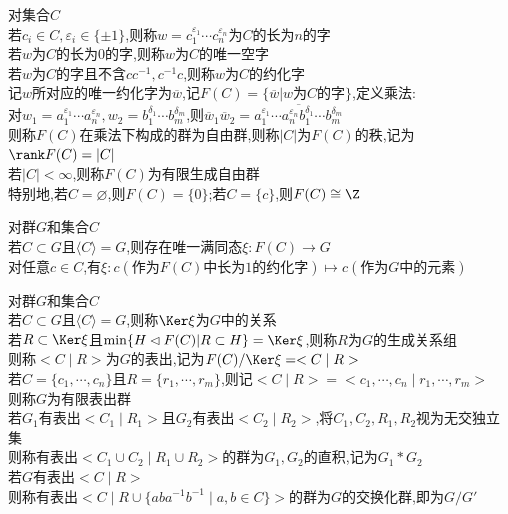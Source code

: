\begin{dingyi}
对集合$C$\\
若$c_i\in C,\varepsilon_i\in\{\pm 1\}$,则称$w=c_1^{\varepsilon_1}\cdots c_n^{\varepsilon_n}$为$C$的长为$n$的字\\
若$w$为$C$的长为$0$的字,则称$w$为$C$的唯一空字\\
若$w$为$C$的字且不含$cc^{-1},c^{-1}c$,则称$w$为$C$的约化字\\
记$w$所对应的唯一约化字为$\overline{w}$,记$F(C)=\{\overline{w}|w\text{为}C\text{的字}\}$,定义乘法:\\
对$w_1=a_1^{\varepsilon_1}\cdots a_n^{\varepsilon_n},w_2=b_1^{\delta_1}\cdots b_m^{\delta_m}$,则$\overline{w}_1\overline{w}_2=\overline{a_1^{\varepsilon_1}\cdots a_n^{\varepsilon_n}b_1^{\delta_1}\cdots b_m^{\delta_m}}$\\
则称$F(C)$在乘法下构成的群为自由群,则称$|C|$为$F(C)$的秩,记为$\rank F(C)=|C|$\\
若$|C|<\infty$,则称$F(C)$为有限生成自由群\\
特别地,若$C=\varnothing$,则$F(C)=\{0\}$;若$C=\{c\}$,则$F(C)\cong\Z$
\end{dingyi}

\begin{dingli}
对群$G$和集合$C$\\
若$C\subset G$且$\langle C\rangle=G$,则存在唯一满同态$\xi: F(C)\to G$\\
对任意$c\in C$,有$\xi:c(\text{作为}F(C)\text{中长为}1\text{的约化字})\mapsto c(\text{作为}G\text{中的元素})$
\end{dingli}

\begin{dingyi}
对群$G$和集合$C$\\
若$C\subset G$且$\langle C\rangle=G$,则称$\Ker\xi$为$G$中的关系\\
若$R\subset\Ker\xi$且$\min\{H\lhd F(C)|R\subset H\}=\Ker\xi$,则称$R$为$G$的生成关系组\\
则称$<C\mid R>$为$G$的表出,记为$F(C)/\Ker\xi=<C\mid R>$\\
若$C=\{c_1,\cdots,c_n\}$且$R=\{r_1,\cdots,r_m\}$,则记$<C\mid R>=<c_1,\cdots,c_n\mid r_1,\cdots,r_m>$\\
则称$G$为有限表出群\\
若$G_1$有表出$<C_1\mid R_1>$且$G_2$有表出$<C_2\mid R_2>$,将$C_1,C_2,R_1,R_2$视为无交独立集\\
则称有表出$<C_1\cup C_2\mid R_1\cup R_2>$的群为$G_1,G_2$的直积,记为$G_1*G_2$\\
若$G$有表出$<C\mid R>$\\
则称有表出$<C\mid R\cup\{aba^{-1}b^{-1}\mid a,b\in C\}>$的群为$G$的交换化群,即为$G/G'$
\end{dingyi}

